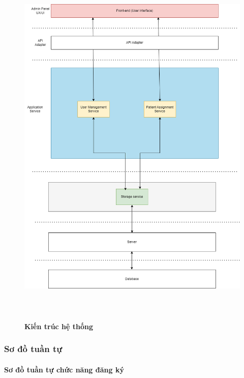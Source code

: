 \documentclass{article}%
\begin{document}
\begin{figure}[H]
  \centering
  \includegraphics[width=16cm,height=18cm]{Images/system/fmECG_architecture-Admin.drawio.png}
  \caption[Kiến trúc hệ thống]{\bfseries \fontsize{12pt}{0pt}\selectfont Kiến trúc hệ thống}
  \label{hinh15} %
\end{figure}

\subsubsection{Sơ đồ tuần tự}

\paragraph{Sơ đồ tuần tự chức năng đăng ký}
\mbox{}
\end{document}
